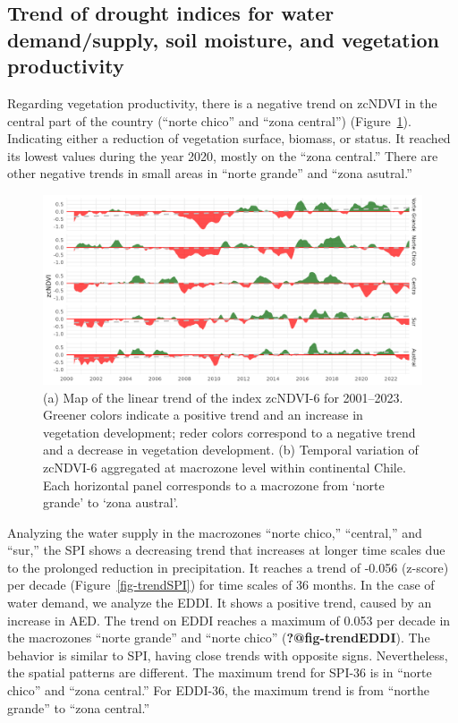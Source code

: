 \documentclass[
  number,
  preprint,
  3p,
  onecolumn]{elsarticle}
\begin{document}
\hypertarget{trend-of-drought-indices-for-water-demandsupply-soil-moisture-and-vegetation-productivity}{%
\subsection{Trend of drought indices for water demand/supply, soil
moisture, and vegetation
productivity}\label{trend-of-drought-indices-for-water-demandsupply-soil-moisture-and-vegetation-productivity}}

Regarding vegetation productivity, there is a negative trend on zcNDVI
in the central part of the country (``norte chico'' and ``zona
central'') (Figure~\ref{fig-zcNDVI_var}). Indicating either a reduction
of vegetation surface, biomass, or status. It reached its lowest values
during the year 2020, mostly on the ``zona central.'' There are other
negative trends in small areas in ``norte grande'' and ``zona asutral.''

\begin{figure}[!ht]

{\centering \includegraphics{../output/figs/temporal_variation_zcNDVI6_macrozonas.png}

}

\caption{\label{fig-zcNDVI_var}(a) Map of the linear trend of the index
zcNDVI-6 for 2001--2023. Greener colors indicate a positive trend and an
increase in vegetation development; reder colors correspond to a
negative trend and a decrease in vegetation development. (b) Temporal
variation of zcNDVI-6 aggregated at macrozone level within continental
Chile. Each horizontal panel corresponds to a macrozone from `norte
grande' to `zona austral'.}

\end{figure}

Analyzing the water supply in the macrozones ``norte chico,''
``central,'' and ``sur,'' the SPI shows a decreasing trend that
increases at longer time scales due to the prolonged reduction in
precipitation. It reaches a trend of -0.056 (z-score) per decade
(Figure~\ref{fig-trendSPI}) for time scales of 36 months. In the case of
water demand, we analyze the EDDI. It shows a positive trend, caused by
an increase in AED. The trend on EDDI reaches a maximum of 0.053 per
decade in the macrozones ``norte grande'' and ``norte chico''
(\textbf{?@fig-trendEDDI}). The behavior is similar to SPI, having close
trends with opposite signs. Nevertheless, the spatial patterns are
different. The maximum trend for SPI-36 is in ``norte chico'' and ``zona
central.'' For EDDI-36, the maximum trend is from ``northe grande'' to
``zona central.''
\end{document}

